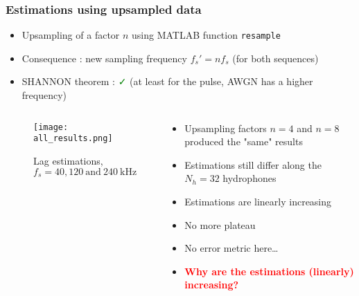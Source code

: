 \documentclass[UKenglish,8pt,aspectratio=1610]{beamer}
\begin{document}
\begin{frame}
\frametitle{Estimations using upsampled data}
\begin{itemize}
	\item Upsampling of a factor $n$ using MATLAB function \texttt{resample}
	\item Consequence : new sampling frequency $f_s'=nf_s$ (for both sequences)
	\item SHANNON theorem : \textcolor{green}{\faCheck} (at least for the pulse, AWGN has a higher frequency)
\end{itemize}

	\begin{columns}
	\begin{column}{0.5\textwidth}
	\vspace{-25pt}
	\begin{figure}[h!]
		\texttt{[image: all\_results.png]}
		\centering
		\caption{Lag estimations, $f_s=40,120~\textrm{and}~240~\si{\kilo\hertz}$}
	\end{figure}
	\end{column}
	\begin{column}{0.5\textwidth}
	\begin{itemize}
		\item Upsampling factors $n=4$ and $n=8$ produced the "same" results 
		\item Estimations still differ along the $N_h=32$ hydrophones
		\item Estimations are linearly increasing 
		\item No more plateau
		\item No error metric here\dots
		\item \textcolor{red}{\textbf{Why are the estimations (linearly) increasing?}}
	\end{itemize}
	\end{column}
\end{columns} 
\end{frame}
\end{document}
